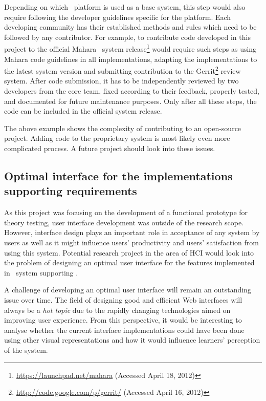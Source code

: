 Depending on which \ep~platform is used as a base system, this step would also
require following the developer guidelines specific for the platform. Each
developing community has their established methods and rules which need to be
followed by any contributor. For example, to contribute code developed in this
project to the official Mahara \ep~system
release\footnote{\url{https://launchpad.net/mahara} (Accessed April 18, 2012)}
would require such steps as using Mahara code guidelines in all implementations,
adapting the implementations to the latest system version and submitting
contribution to the Gerrit\footnote{\url{http://code.google.com/p/gerrit/}
(Accessed April 16, 2012)} review system. After code submission, it has to be
independently reviewed by two developers from the core team, fixed according to
their feedback, properly tested, and documented for future maintenance purposes.
Only after all these steps, the code can be included in the official system
release.

The above example shows the complexity of contributing to an open-source
project. Adding code to the proprietary system is most likely even more
complicated process. A future project should look into these issues.

\subsection[Optimal interface design]{Optimal interface for the implementations
supporting \LLLs requirements} 

As this project was focusing on the development of a functional prototype for
theory testing, user interface development was outside of the research scope.
However, interface design plays an important role in acceptance of any system by
users as well as it might influence users' productivity and users' satisfaction
from using this system. Potential research project in the area of HCI would look
into the problem of designing an optimal user interface for the features
implemented in \ep~system supporting \LLLsn.

A challenge of developing an optimal user interface will remain an outstanding
issue over time. The field of designing good and efficient Web interfaces will
always be a \textit{hot topic} due to the rapidly changing technologies aimed on
improving user experience. From this perspective, it would be interesting to
analyse whether the current interface implementations could have been done using
other visual representations and how it would influence learners' perception of
the system.


